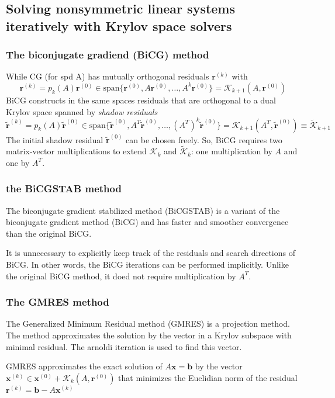 \subsection{Solving nonsymmetric linear systems iteratively with Krylov space solvers}

\subsubsection{The biconjugate gradiend (BiCG) method}

While CG (for spd A) has mutually orthogonal residuals $\mathbf{r}^{(k)}$ with
$$
    \mathbf{r}^{(k)}
    =
    p_k(A) \mathbf{r}^{(0)}
    \in
    \mathrm{span} \{ \mathbf r^{(0)}, A \mathbf r^{(0)}, \dots, A^k \mathbf r^{(0)} \}
    =
    \mathscr K_{k+1}(A, \mathbf r^{(0)})
$$
BiCG constructs in the same spaces residuals that are orthogonal to a dual Krylov
space spanned by \textit{shadow residuals}
$$
    \tilde{\mathbf{r}}^{(k)}
    =
    p_k(A) \tilde{\mathbf{r}}^{(0)}
    \in
    \mathrm{span} \{ \tilde{\mathbf r}^{(0)}, A^T \tilde{\mathbf r}^{(0)}, \dots, (A^T)^k \tilde{\mathbf r}^{(0)} \}
    =
    \mathscr K_{k+1}(A^T, \tilde{\mathbf r}^{(0)})
    \equiv
    \tilde{\mathscr{K}}_{k+1}
$$
The initial shadow residual $\tilde{\mathbf{r}}^(0)$ can be chosen freely.
So, BiCG requires two matrix-vector multiplications to extend $\mathscr K_k$ and $\tilde{\mathscr K}_k$:
one multiplication by $A$ and one by $A^T$.

\subsubsection{the BiCGSTAB method}

The biconjugate gradient stabilized method (BiCGSTAB) is a
variant of the biconjugate gradient method (BiCG) and has faster
and smoother convergence than the original BiCG.

It is unnecessary to explicitly keep track of the residuals and search directions of BiCG.
In other words, the BiCG iterations can be performed implicitly.
Unlike the original BiCG method, it doed not require multiplication by $A^T$.

\subsubsection{The GMRES method}

The Generalized Minimum Residual method (GMRES) is a projection method.
The method approximates the solution by the vector in a Krylov subspace
with minimal residual. The arnoldi iteration is used to find this vector.

GMRES approximates the exact solution of $A \mathbf x = \mathbf b$ by the vector
$\mathbf x^{(k)} \in \mathbf x^{(0)} + \mathscr K_k(A, \mathbf r^{(0)})$
that minimizes the Euclidian norm of the residual
$\mathbf r^{(k)} = \mathbf b - A \mathbf x^{(k)}$
